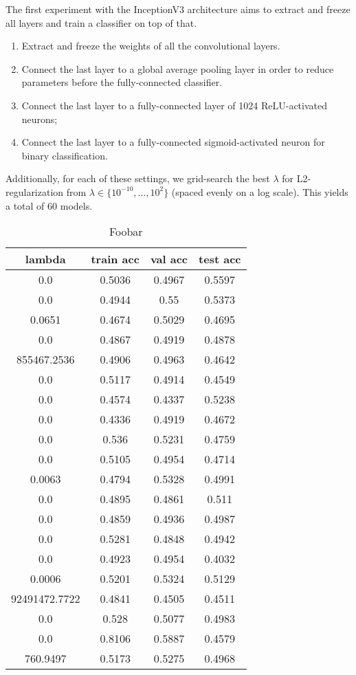 The first experiment with the InceptionV3 architecture aims to extract and freeze all layers and train a classifier on top of that.

\begin{enumerate}
    \item Extract and freeze the weights of all the convolutional layers.
    \item Connect the last layer to a global average pooling layer in order to reduce parameters before the fully-connected classifier.
    \item Connect the last layer to a fully-connected layer of 1024 ReLU-activated neurons;
    \item Connect the last layer to a fully-connected sigmoid-activated neuron for binary classification.
\end{enumerate}

Additionally, for each of these settings, we grid-search the best $\lambda$ for L2-regularization from $\lambda \in \{10^{-10}, ..., 10^{2}\}$ (spaced evenly on a log scale). This yields a total of $60$ models.

\begin{table}[ht]
\centering \begin{tabular}{ |c|c|c|c| }
\hline
lambda & train acc & val acc & test acc \\
\hline
0.0 & 0.5036 & 0.4967 & 0.5597 \\
0.0 & 0.4944 & 0.55 & 0.5373 \\
0.0651 & 0.4674 & 0.5029 & 0.4695 \\
0.0 & 0.4867 & 0.4919 & 0.4878 \\
855467.2536 & 0.4906 & 0.4963 & 0.4642 \\
0.0 & 0.5117 & 0.4914 & 0.4549 \\
0.0 & 0.4574 & 0.4337 & 0.5238 \\
0.0 & 0.4336 & 0.4919 & 0.4672 \\
0.0 & 0.536 & 0.5231 & 0.4759 \\
0.0 & 0.5105 & 0.4954 & 0.4714 \\
0.0063 & 0.4794 & 0.5328 & 0.4991 \\
0.0 & 0.4895 & 0.4861 & 0.511 \\
0.0 & 0.4859 & 0.4936 & 0.4987 \\
0.0 & 0.5281 & 0.4848 & 0.4942 \\
0.0 & 0.4923 & 0.4954 & 0.4032 \\
0.0006 & 0.5201 & 0.5324 & 0.5129 \\
92491472.7722 & 0.4841 & 0.4505 & 0.4511 \\
0.0 & 0.528 & 0.5077 & 0.4983 \\
0.0 & 0.8106 & 0.5887 & 0.4579 \\
760.9497 & 0.5173 & 0.5275 & 0.4968 \\
\hline
\end{tabular}
\caption{Foobar}
\label{table:foobar}
\end{table}


